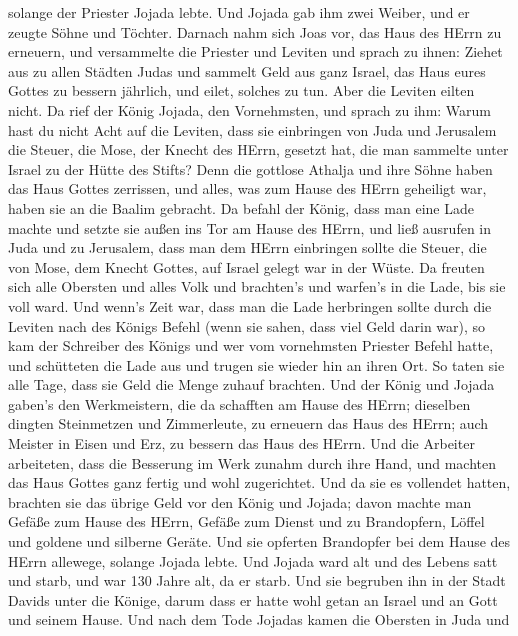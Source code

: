 solange der Priester Jojada lebte.  Und Jojada gab ihm zwei
Weiber, und er zeugte Söhne und Töchter.  Darnach nahm sich
Joas vor, das Haus des HErrn zu erneuern,  und versammelte
die Priester und Leviten und sprach zu ihnen: Ziehet aus zu allen
Städten Judas und sammelt Geld aus ganz Israel, das Haus eures Gottes zu
bessern jährlich, und eilet, solches zu tun. Aber die Leviten eilten
nicht.  Da rief der König Jojada, den Vornehmsten, und
sprach zu ihm: Warum hast du nicht Acht auf die Leviten, dass sie
einbringen von Juda und Jerusalem die Steuer, die Mose, der Knecht des
HErrn, gesetzt hat, die man sammelte unter Israel zu der Hütte des
Stifts?  Denn die gottlose Athalja und ihre Söhne haben das
Haus Gottes zerrissen, und alles, was zum Hause des HErrn geheiligt war,
haben sie an die Baalim gebracht.  Da befahl der König, dass
man eine Lade machte und setzte sie außen ins Tor am Hause des HErrn,
 und ließ ausrufen in Juda und zu Jerusalem, dass man dem
HErrn einbringen sollte die Steuer, die von Mose, dem Knecht Gottes, auf
Israel gelegt war in der Wüste.  Da freuten sich alle
Obersten und alles Volk und brachten's und warfen's in die Lade, bis sie
voll ward.  Und wenn's Zeit war, dass man die Lade
herbringen sollte durch die Leviten nach des Königs Befehl (wenn sie
sahen, dass viel Geld darin war), so kam der Schreiber des Königs und
wer vom vornehmsten Priester Befehl hatte, und schütteten die Lade aus
und trugen sie wieder hin an ihren Ort. So taten sie alle Tage, dass sie
Geld die Menge zuhauf brachten.  Und der König und Jojada
gaben's den Werkmeistern, die da schafften am Hause des HErrn; dieselben
dingten Steinmetzen und Zimmerleute, zu erneuern das Haus des HErrn;
auch Meister in Eisen und Erz, zu bessern das Haus des HErrn.
 Und die Arbeiter arbeiteten, dass die Besserung im Werk
zunahm durch ihre Hand, und machten das Haus Gottes ganz fertig und wohl
zugerichtet.  Und da sie es vollendet hatten, brachten sie
das übrige Geld vor den König und Jojada; davon machte man Gefäße zum
Hause des HErrn, Gefäße zum Dienst und zu Brandopfern, Löffel und
goldene und silberne Geräte. Und sie opferten Brandopfer bei dem Hause
des HErrn allewege, solange Jojada lebte.  Und Jojada ward
alt und des Lebens satt und starb, und war 130 Jahre alt, da er starb.
 Und sie begruben ihn in der Stadt Davids unter die Könige,
darum dass er hatte wohl getan an Israel und an Gott und seinem Hause.
 Und nach dem Tode Jojadas kamen die Obersten in Juda und
